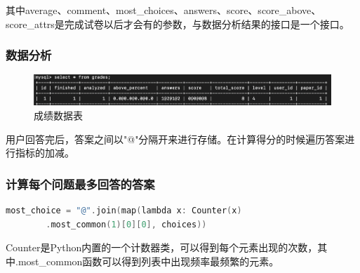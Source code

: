 其中average、comment、most\_choices、answers、score、score\_above、score\_attrs是完成试卷以后才会有的参数，与数据分析结果的接口是一个接口。

\subsubsection{数据分析}

\begin{figure}[thbp!]
	\centering
	\includegraphics[width=1.0\linewidth]{figure/grade}
	\caption{成绩数据表}
	\label{fig:grade}
\end{figure}

用户回答完后，答案之间以"@"分隔开来进行存储。在计算得分的时候遍历答案进行指标的加减。

\subsubsection{计算每个问题最多回答的答案}

\begin{lstlisting}[language=C]
most_choice = "@".join(map(lambda x: Counter(x)
		.most_common(1)[0][0], choices))
\end{lstlisting}

Counter是Python内置的一个计数器类，可以得到每个元素出现的次数，其中.most\_common函数可以得到列表中出现频率最频繁的元素。
